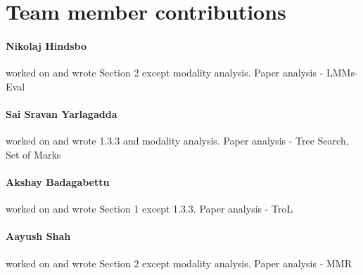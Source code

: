 \documentclass[11pt,a4paper]{article}
\begin{document}


\section{Team member contributions}
\paragraph{Nikolaj Hindsbo} worked on and wrote Section 2 except modality analysis. Paper analysis - LMMs-Eval

\paragraph{Sai Sravan Yarlagadda} worked on and wrote 1.3.3 and modality analysis. Paper analysis - Tree Search, Set of Marks

\paragraph{Akshay Badagabettu} worked on and wrote Section 1 except 1.3.3. Paper analysis - TroL

\paragraph{Aayush Shah} worked on and wrote Section 2 except modality analysis. Paper analysis - MMR




\end{document}
